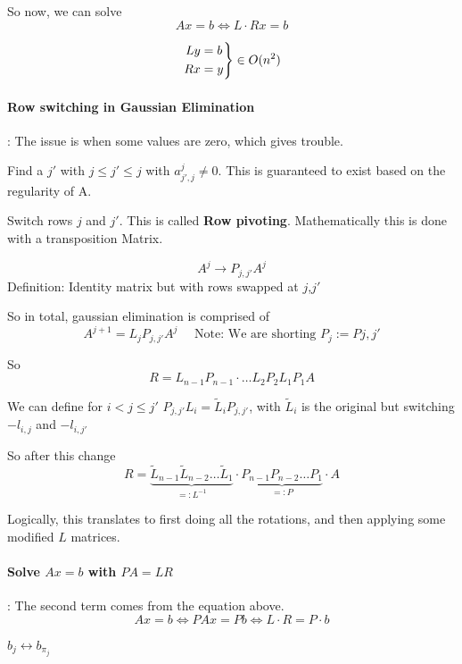 \documentclass{article}
\newenvironment{rcases}
  {\left.\begin{aligned}}
  {\end{aligned}\right\rbrace}
\begin{document}
So now, we can solve
\[Ax = b \Leftrightarrow L\cdot R x = b\]

\[\begin{rcases}
  Ly &= b  \\
  Rx &= y \\
\end{rcases} \in O(n^2)\]

\paragraph{Row switching in Gaussian Elimination}: The issue is when some values are zero, which gives trouble.

Find a $j'$ with $j \leq j' \leq j$ with $a^j_{j',j} \neq 0$. This is guaranteed to exist based on the regularity of A.

Switch rows $j$ and $j'$. This is called \textbf{Row pivoting}. Mathematically this is done with a transposition Matrix.

\[A^j \to P_{j,j'}A^j\]
Definition: Identity matrix but with rows swapped at $j$,$j'$


So in total, gaussian elimination is comprised of 
\[A^{j+1} = L_jP_{j,j'}A^j \quad\text{ Note: We are shorting } P_j := P{j,j'}\]

So
\[R = L_{n-1}P_{n-1} \cdot \dots   L_2P_2L_1P_1A\]

We can define for $i < j \leq j'$ $P_{j,j'}L_i= \tilde{L}_iP_{j,j'}$, with $\tilde{L}_i$ is the original but switching $-l_{i,j}$ and $-l_{i,j'}$

So after this change
\[R = \underbrace{\tilde{L}_{n-1}\tilde{L}_{n-2}\dots \tilde{L}_1}_{=: L ^{-1}}\cdot\underbrace{P_{n-1}P_{n-2}\dots P_1}_{=: P}\cdot A\]

Logically, this translates to first doing all the rotations, and then applying some modified $L$ matrices.


\paragraph{Solve $Ax = b$ with $PA = LR$}: The second term comes from the equation above.
\[Ax = b \Leftrightarrow PAx = Pb \Leftrightarrow L\cdot R = P \cdot b\]

\begin{algorithm}[H]
\caption{Gaussian Elimination with row pivoting. Store all $j'$ in a permutation vector $\pi$ with $\pi_j = j'$}
\begin{algorithmic}[1]
  \State $b_j \leftrightarrow b_{\pi_j}$
\EndFor
\end{algorithmic}
\end{algorithm}
\end{document}
